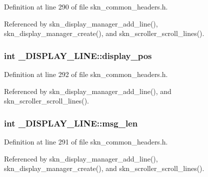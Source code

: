 Definition at line 290 of file skn\+\_\+common\+\_\+headers.\+h.



Referenced by skn\+\_\+display\+\_\+manager\+\_\+add\+\_\+line(), skn\+\_\+display\+\_\+manager\+\_\+create(), and skn\+\_\+scroller\+\_\+scroll\+\_\+lines().

\hypertarget{struct___d_i_s_p_l_a_y___l_i_n_e_af32b1aa2ce817c27695d7cd43db9364d}{}
\subsubsection[{display\+\_\+pos}]{\setlength{\rightskip}{0pt plus 5cm}int \+\_\+\+D\+I\+S\+P\+L\+A\+Y\+\_\+\+L\+I\+N\+E\+::display\+\_\+pos}\label{struct___d_i_s_p_l_a_y___l_i_n_e_af32b1aa2ce817c27695d7cd43db9364d}


Definition at line 292 of file skn\+\_\+common\+\_\+headers.\+h.



Referenced by skn\+\_\+display\+\_\+manager\+\_\+add\+\_\+line(), and skn\+\_\+scroller\+\_\+scroll\+\_\+lines().

\hypertarget{struct___d_i_s_p_l_a_y___l_i_n_e_aa9cfa1dd3e90386f675fef61e711342e}{}
\subsubsection[{msg\+\_\+len}]{\setlength{\rightskip}{0pt plus 5cm}int \+\_\+\+D\+I\+S\+P\+L\+A\+Y\+\_\+\+L\+I\+N\+E\+::msg\+\_\+len}\label{struct___d_i_s_p_l_a_y___l_i_n_e_aa9cfa1dd3e90386f675fef61e711342e}


Definition at line 291 of file skn\+\_\+common\+\_\+headers.\+h.



Referenced by skn\+\_\+display\+\_\+manager\+\_\+add\+\_\+line(), skn\+\_\+display\+\_\+manager\+\_\+create(), and skn\+\_\+scroller\+\_\+scroll\+\_\+lines().

\hypertarget{struct___d_i_s_p_l_a_y___l_i_n_e_a0668a4de4eb91d9bbd03cc52b00f4fd0}{}
